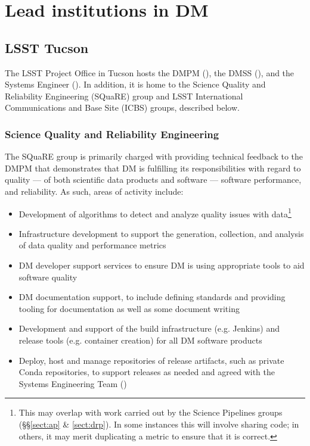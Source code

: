 \section{Lead institutions in \gls{DM} \label{sect:leadtutes}}

\subsection{LSST Tucson\label{sect:tucson}}

The \gls{LSST} Project Office in Tucson hosts the \gls{DMPM} (), the \gls{DMSS} (), and the \gls{Systems Engineer} ().
In addition, it is home to the Science Quality and Reliability Engineering (\gls{SQuaRE}) group and \gls{LSST} International Communications and Base Site (\gls{ICBS}) groups, described below.

\subsubsection{Science Quality and Reliability Engineering \label{sect:square}}

The \gls{SQuaRE} group is primarily charged with providing technical feedback to the \gls{DMPM} that demonstrates that \gls{DM} is fulfilling its responsibilities with regard to quality — of both scientific data products and software — software performance, and reliability. As such, areas of activity include:

\begin{itemize}

\item Development of algorithms to detect and analyze quality issues with data\footnote{This may overlap with work carried out by the \gls{Science Pipelines} groups (\S\S\ref{sect:ap} \& \ref{sect:drp}). In some instances this will involve sharing code; in others, it may merit duplicating a \gls{metric} to ensure that it is correct.}

\item Infrastructure development to support the generation, collection, and analysis of data quality and performance metrics

\item \gls{DM} developer support services to ensure \gls{DM} is using appropriate tools to aid software quality

\item \gls{DM} documentation support, to include defining standards and providing tooling for documentation as well as some document writing

\item Development and support of the build infrastructure (e.g. Jenkins) and release tools (e.g. container creation) for all \gls{DM} software products

\item Deploy, host and manage repositories of release artifacts, such as private Conda repositories, to support releases as needed and agreed with the Systems Engineering Team ()

\end{itemize}

